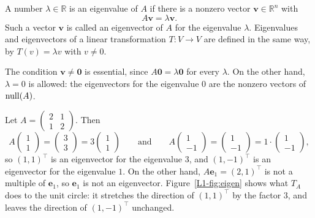 \begin{definition}
    A number $\lambda \in \mathbb{R}$ is an eigenvalue of $A$ if there is a nonzero vector $\mathbf{v} \in \mathbb{R}^n$ with
    \[A\mathbf{v} = \lambda \mathbf{v}.\]
    Such a vector $\mathbf{v}$ is called an eigenvector of $A$ for the eigenvalue $\lambda$. Eigenvalues and eigenvectors of a linear transformation $T: V \to V$ are defined in the same way, by $T(v) = \lambda v$ with $v \neq 0$.
\end{definition}

The condition $\mathbf{v} \neq \mathbf{0}$ is essential, since $A\mathbf{0} = \lambda \mathbf{0}$ for every $\lambda$. On the other hand, $\lambda = 0$ is allowed: the eigenvectors for the eigenvalue $0$ are the nonzero vectors of $\operatorname{null}(A)$.

\begin{example}\label{L1-ex:eigen-first}
    Let $A = \begin{pmatrix} 2 & 1 \\ 1 & 2 \end{pmatrix}$. Then
    \[A \begin{pmatrix} 1 \\ 1 \end{pmatrix} = \begin{pmatrix} 3 \\ 3 \end{pmatrix} = 3 \begin{pmatrix} 1 \\ 1 \end{pmatrix} \qquad \text{and} \qquad A \begin{pmatrix} 1 \\ -1 \end{pmatrix} = \begin{pmatrix} 1 \\ -1 \end{pmatrix} = 1 \cdot \begin{pmatrix} 1 \\ -1 \end{pmatrix},\]
    so $(1, 1)^\top$ is an eigenvector for the eigenvalue $3$, and $(1, -1)^\top$ is an eigenvector for the eigenvalue $1$. On the other hand, $A \mathbf{e}_1 = (2, 1)^\top$ is not a multiple of $\mathbf{e}_1$, so $\mathbf{e}_1$ is not an eigenvector. Figure~\ref{L1-fig:eigen} shows what $T_A$ does to the unit circle: it stretches the direction of $(1, 1)^\top$ by the factor $3$, and leaves the direction of $(1, -1)^\top$ unchanged.
\end{example}

